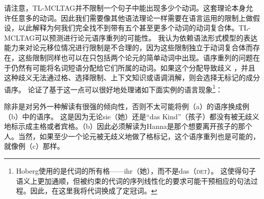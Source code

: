 请注意，TL-MCLTAG并不限制一个句子中能出现多少个动词。这套理论本身允许任意多的动词。因此我们需要像其他语法理论一样需要在语言运用的限制上做假设，以此解释为何我们完全找不到带有五个甚至更多个动词的动词复合体。TL-MCLTAG可以预测进行论元语序重列的可能性。
我认为依赖语法形式模型的表达能力来对论元移位情况进行限制是不合理的，因为这些限制独立于动词复合体而存在，这些限制同样也可以在只包括两个论元的简单动词中出现。语序重列的问题在于仍然有可能将名词短语分配给它们所属的动词。如果这个分配导致歧义
，并且这种歧义无法通过格、选择限制、上下文知识或语调消解，则会选择无标记的成分语序。
\citet*[]{Hoberg81a}论证了基于这一点可以很好地处理诸如下面实例的语言现象\footnote{%
Hoberg使用的是代词的所有格——ihr（她），而不是das（\textsc{det}）。
这使得句子语义上更加通顺，但被约束的代词的序列线性化的要求可能干预相应的句法过程。因此，在这里我将代词换成了定冠词。
}：
\eal
\judgewidth{\#}
\zl

\noindent
除非是对另外一种解读有很强的倾向性，否则不太可能将例（a）的语序换成例（b）中的语序。
这是因为无论sie（她）还是“das Kind”（孩子）都没有被无歧义地标示成主格或者宾格。（b）因此必须解读为Hanna是那个想要离开孩子的那个人。当然，如果至少一个论元被无歧义地做了格标记，这个语序重列也是可能的，就像例（c）那样。

